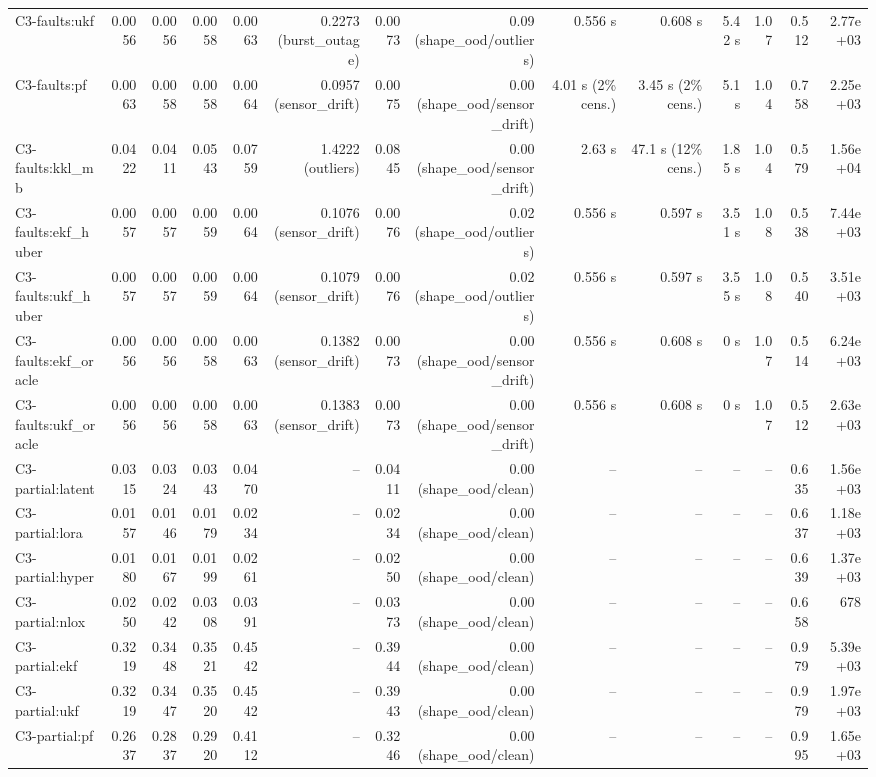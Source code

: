 \begin{table}[t]
\begin{tabular}{lrrrrrrrrrrrrr}
C3-faults:ukf & 0.0056 & 0.0056 & 0.0058 & 0.0063 & 0.2273 (burst\_outage) & 0.0073 & 0.09 (shape\_ood/outliers) & 0.556 s & 0.608 s & 5.42 s & 1.07 & 0.512 & 2.77e+03 \\
C3-faults:pf & 0.0063 & 0.0058 & 0.0058 & 0.0064 & 0.0957 (sensor\_drift) & 0.0075 & 0.00 (shape\_ood/sensor\_drift) & 4.01 s (2\% cens.) & 3.45 s (2\% cens.) & 5.1 s & 1.04 & 0.758 & 2.25e+03 \\
C3-faults:kkl\_mb & 0.0422 & 0.0411 & 0.0543 & 0.0759 & 1.4222 (outliers) & 0.0845 & 0.00 (shape\_ood/sensor\_drift) & 2.63 s & 47.1 s (12\% cens.) & 1.85 s & 1.04 & 0.579 & 1.56e+04 \\
C3-faults:ekf\_huber & 0.0057 & 0.0057 & 0.0059 & 0.0064 & 0.1076 (sensor\_drift) & 0.0076 & 0.02 (shape\_ood/outliers) & 0.556 s & 0.597 s & 3.51 s & 1.08 & 0.538 & 7.44e+03 \\
C3-faults:ukf\_huber & 0.0057 & 0.0057 & 0.0059 & 0.0064 & 0.1079 (sensor\_drift) & 0.0076 & 0.02 (shape\_ood/outliers) & 0.556 s & 0.597 s & 3.55 s & 1.08 & 0.540 & 3.51e+03 \\
C3-faults:ekf\_oracle & 0.0056 & 0.0056 & 0.0058 & 0.0063 & 0.1382 (sensor\_drift) & 0.0073 & 0.00 (shape\_ood/sensor\_drift) & 0.556 s & 0.608 s & 0 s & 1.07 & 0.514 & 6.24e+03 \\
C3-faults:ukf\_oracle & 0.0056 & 0.0056 & 0.0058 & 0.0063 & 0.1383 (sensor\_drift) & 0.0073 & 0.00 (shape\_ood/sensor\_drift) & 0.556 s & 0.608 s & 0 s & 1.07 & 0.512 & 2.63e+03 \\
C3-partial:latent & 0.0315 & 0.0324 & 0.0343 & 0.0470 & – & 0.0411 & 0.00 (shape\_ood/clean) & – & – & – & – & 0.635 & 1.56e+03 \\
C3-partial:lora & 0.0157 & 0.0146 & 0.0179 & 0.0234 & – & 0.0234 & 0.00 (shape\_ood/clean) & – & – & – & – & 0.637 & 1.18e+03 \\
C3-partial:hyper & 0.0180 & 0.0167 & 0.0199 & 0.0261 & – & 0.0250 & 0.00 (shape\_ood/clean) & – & – & – & – & 0.639 & 1.37e+03 \\
C3-partial:nlox & 0.0250 & 0.0242 & 0.0308 & 0.0391 & – & 0.0373 & 0.00 (shape\_ood/clean) & – & – & – & – & 0.658 & 678 \\
C3-partial:ekf & 0.3219 & 0.3448 & 0.3521 & 0.4542 & – & 0.3944 & 0.00 (shape\_ood/clean) & – & – & – & – & 0.979 & 5.39e+03 \\
C3-partial:ukf & 0.3219 & 0.3447 & 0.3520 & 0.4542 & – & 0.3943 & 0.00 (shape\_ood/clean) & – & – & – & – & 0.979 & 1.97e+03 \\
C3-partial:pf & 0.2637 & 0.2837 & 0.2920 & 0.4112 & – & 0.3246 & 0.00 (shape\_ood/clean) & – & – & – & – & 0.995 & 1.65e+03 \\

\end{tabular}
\end{table}
